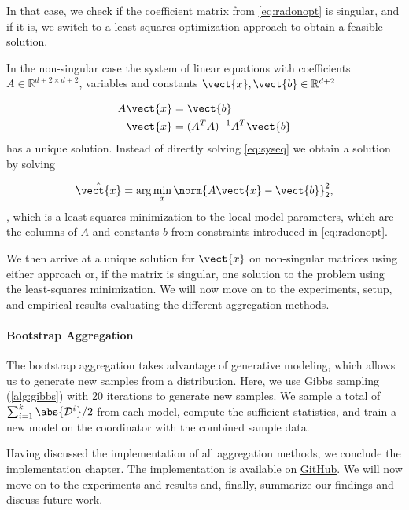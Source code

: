 In that case, we check if the coefficient matrix from \autoref{eq:radonopt} is singular, and if it is, we switch to a least-squares optimization approach to obtain a feasible solution. 

In the non-singular case the system of linear equations with coefficients $A \in \mathbb{R}^{d+2 \times d+2}$, variables and constants $\vect{x}, \vect{b} \in \mathbb{R}^{d+2}$

\begin{equation}
    \label{eq:syseq}
    \begin{split}
        A\vect{x} &= \vect{b} \\
        \vect{x} &= (A^TA)^{-1}A^T \vect{b}
    \end{split}
\end{equation}
has a unique solution.
Instead of directly solving \autoref{eq:syseq} we obtain a solution by solving 

\begin{equation}
    \hat{\vect{x}} = \arg\min_{x} \norm{A\vect{x} - \vect{b}}^2_2,
\end{equation}
, which is a least squares minimization \wrt to the local model parameters, which are the columns of $A$ and constants $b$ from constraints introduced in \autoref{eq:radonopt}.

We then arrive at a unique solution for $\vect{x}$ on non-singular matrices using either approach or, if the matrix is singular, one solution to the problem using the least-squares minimization.
We will now move on to the experiments, setup, and empirical results evaluating the different aggregation methods.


\paragraph*{Bootstrap Aggregation}

The bootstrap aggregation takes advantage of generative modeling, which allows us to generate new samples from a distribution.
Here, we use Gibbs sampling (\autoref{alg:gibbs}) with 20 iterations to generate new samples.
We sample a total of $\sum_{i=1}^k \abs{\mathcal{D}^i} /2$ from each model, compute the sufficient statistics, and train a new model on the coordinator with the combined sample data.

Having discussed the implementation of all aggregation methods, we conclude the implementation chapter.
The implementation is available on \href{https://github.com/Xst4r/Distributed-PGM/tree/master/Code}{GitHub}.
We will now move on to the experiments and results and, finally, summarize our findings and discuss future work.